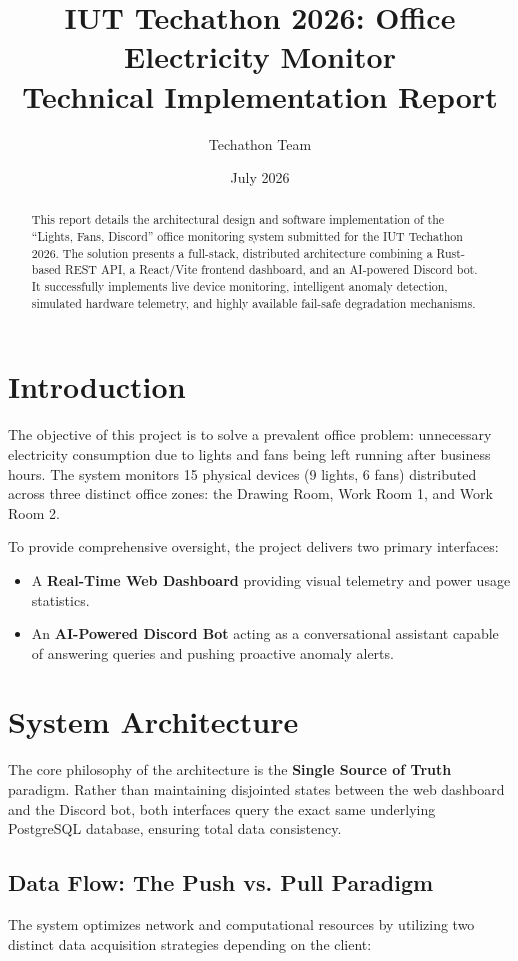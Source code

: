 \documentclass[12pt,a4paper]{article}
\title{\textbf{IUT Techathon 2026: Office Electricity Monitor}\\ \Large Technical Implementation Report}
\author{Techathon Team}
\date{July 2026}
\begin{document}
\maketitle
\begin{abstract}
This report details the architectural design and software implementation of the ``Lights, Fans, Discord'' office monitoring system submitted for the IUT Techathon 2026. The solution presents a full-stack, distributed architecture combining a Rust-based REST API, a React/Vite frontend dashboard, and an AI-powered Discord bot. It successfully implements live device monitoring, intelligent anomaly detection, simulated hardware telemetry, and highly available fail-safe degradation mechanisms.
\end{abstract}

\tableofcontents
\newpage

\section{Introduction}
The objective of this project is to solve a prevalent office problem: unnecessary electricity consumption due to lights and fans being left running after business hours. The system monitors 15 physical devices (9 lights, 6 fans) distributed across three distinct office zones: the Drawing Room, Work Room 1, and Work Room 2. 

To provide comprehensive oversight, the project delivers two primary interfaces:
\begin{itemize}
    \item A \textbf{Real-Time Web Dashboard} providing visual telemetry and power usage statistics.
    \item An \textbf{AI-Powered Discord Bot} acting as a conversational assistant capable of answering queries and pushing proactive anomaly alerts.
\end{itemize}

\section{System Architecture}
The core philosophy of the architecture is the \textbf{Single Source of Truth} paradigm. Rather than maintaining disjointed states between the web dashboard and the Discord bot, both interfaces query the exact same underlying PostgreSQL database, ensuring total data consistency.

\subsection{Data Flow: The Push vs. Pull Paradigm}
The system optimizes network and computational resources by utilizing two distinct data acquisition strategies depending on the client:
\end{document}
